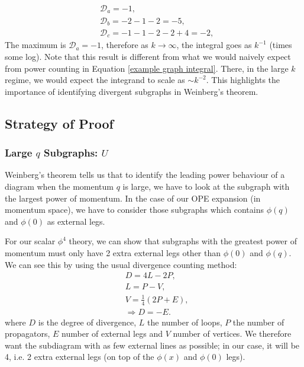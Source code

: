 \documentclass{article}
\begin{document}
\begin{equation}
\begin{split}
    &\mathcal{D}_a= -1,\\ &\mathcal{D}_b= -2-1-2=-5,\\ &\mathcal{D}_c= -1-1-2-2+4=-2,  
\end{split}
\end{equation}
The maximum is $\mathcal{D}_a= -1$, therefore as $k \rightarrow \infty$, the integral goes as $k^{-1}$ (times some log). Note that this result is different from what we would naively expect from power counting in Equation \ref{example graph integral}. There, in the large $k$ regime, we would expect the integrand to scale as $\sim k^{-2}$. This highlights the importance of identifying divergent subgraphs in Weinberg's theorem. 

\subsection{Strategy of Proof}
\subsubsection{Large $q$ Subgraphs: $U$}
Weinberg's theorem tells us that to identify the leading power behaviour of a diagram when the momentum $q$ is large, we have to look at the subgraph with the largest power of momentum. In the case of our OPE expansion (in momentum space), we have to consider those subgraphs which contains $\phi(q)$ and $\phi(0)$ as external legs. 

For our scalar $\phi^4$ theory, we can show that subgraphs with the greatest power of momentum must only have 2 extra external legs other than $\phi(0)$ and $\phi(q)$. We can see this by using the usual divergence counting method:
\begin{equation}
\begin{split}
    &D=4L-2P,\\
    &L=P-V,\\
    &V=\frac{1}{4}(2P+E),\\
    &\Rightarrow D=-E.
\end{split}
\end{equation}
where $D$ is the degree of divergence, $L$ the number of loops, $P$ the number of propagators, $E$ number of external legs and $V$ number of vertices. We therefore want the subdiagram with as few external lines as possible; in our case, it will be 4, i.e. 2 extra external legs (on top of the $\phi(x)$ and $\phi(0)$ legs). 
\end{document}
